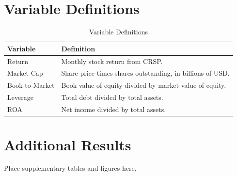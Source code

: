 \documentclass[12pt,a4paper]{article}
\begin{document}
\newpage
\begin{appendices}
\section{Variable Definitions}
\label{app:variables}

\begin{table}[H]
\centering
\caption{Variable Definitions}
\label{tab:vardef}
\begin{tabularx}{\textwidth}{lX}
\toprule
Variable & Definition \\
\midrule
Return        & Monthly stock return from CRSP. \\
Market Cap    & Share price times shares outstanding, in billions of USD. \\
Book-to-Market & Book value of equity divided by market value of equity. \\
Leverage      & Total debt divided by total assets. \\
ROA           & Net income divided by total assets. \\
\bottomrule
\end{tabularx}
\end{table}

\section{Additional Results}
\label{app:additional}

Place supplementary tables and figures here.

\end{appendices}
\end{document}
